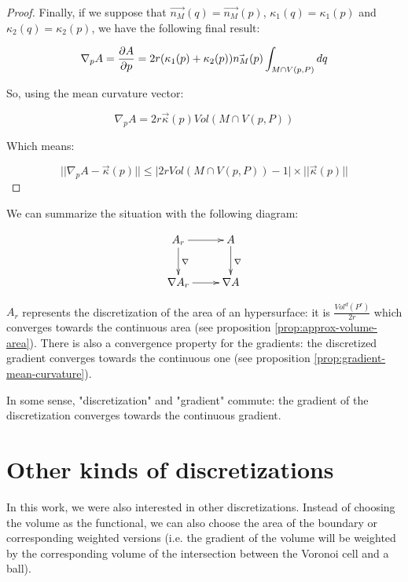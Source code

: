 \begin{proof}
Finally, if we suppose that $ \vec{n_M}(q) = \vec{n_M}(p) $, $ \kappa_1(q) =
\kappa_1(p) $ and $ \kappa_2(q) = \kappa_2(p) $, we have the following final
result:

$$ \nabla_p A = \frac{\partial{A}}{\partial{p}} = 2r (\kappa_1(p) + \kappa_2(p)) \vec{n_M}(p) \int_{M \cap V(p, P)} dq $$

So, using the mean curvature vector:

$$ \nabla_p A = 2r \vec{\kappa}(p) Vol(M \cap V(p, P)) $$

Which means:

$$ ||\nabla_p A - \vec{\kappa}(p) || \leq | 2r Vol(M \cap V(p, P)) - 1 |
\times|| \vec{\kappa}(p) ||$$

\end{proof}

We can summarize the situation with the following diagram:

\begin{displaymath}
    \xymatrix{A_r \ar[d]^{\nabla} \ar[r] & A \ar[d]^{\nabla} \\
        \nabla A_r \ar[r] & \nabla A }
\end{displaymath}

$ A_r $ represents the discretization of the area of an hypersurface: it
is $ \frac{Vol^d(P^r)}{2r} $ which converges towards the continuous area (see
proposition \ref{prop:approx-volume-area}). There is also a convergence property
for the gradients: the discretized gradient converges towards the continuous one
(see proposition \ref{prop:gradient-mean-curvature}).

In some sense, "discretization" and "gradient" commute: the gradient of the
discretization converges towards the continuous gradient.


\section{Other kinds of discretizations}

In this work, we were also interested in other discretizations. Instead of
choosing the volume as the functional, we can also choose the area of the
boundary or corresponding weighted versions (i.e. the gradient of the volume
will be weighted by the corresponding volume of the intersection between the
Voronoi cell and a ball).

